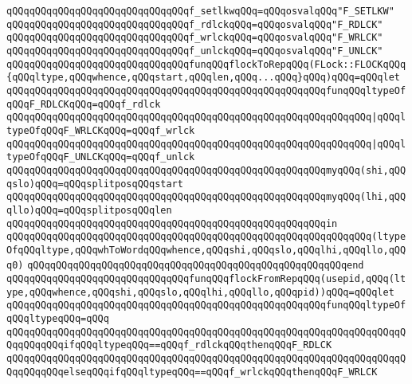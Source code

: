 \verb|qQQqqQQqqQQqqQQqqQQqqQQqqQQqqQQqf_setlkwqQQq=qQQqosvalqQQq"F_SETLKW"|\newline
\verb|qQQqqQQqqQQqqQQqqQQqqQQqqQQqqQQqf_rdlckqQQq=qQQqosvalqQQq"F_RDLCK"|\newline
\verb|qQQqqQQqqQQqqQQqqQQqqQQqqQQqqQQqf_wrlckqQQq=qQQqosvalqQQq"F_WRLCK"|\newline
\verb|qQQqqQQqqQQqqQQqqQQqqQQqqQQqqQQqf_unlckqQQq=qQQqosvalqQQq"F_UNLCK"|\newline
\newline
\verb|qQQqqQQqqQQqqQQqqQQqqQQqqQQqqQQqfunqQQqflockToRepqQQq(FLock::FLOCKqQQq{qQQqltype,qQQqwhence,qQQqstart,qQQqlen,qQQq...qQQq}qQQq)qQQq=qQQqlet|\newline
\verb|qQQqqQQqqQQqqQQqqQQqqQQqqQQqqQQqqQQqqQQqqQQqqQQqqQQqqQQqfunqQQqltypeOfqQQqF_RDLCKqQQq=qQQqf_rdlck|\newline
\verb|qQQqqQQqqQQqqQQqqQQqqQQqqQQqqQQqqQQqqQQqqQQqqQQqqQQqqQQqqQQqqQQq|\verb#|qQQqltypeOfqQQqF_WRLCKqQQq=qQQqf_wrlck#\newline
\verb|qQQqqQQqqQQqqQQqqQQqqQQqqQQqqQQqqQQqqQQqqQQqqQQqqQQqqQQqqQQqqQQq|\verb#|qQQqltypeOfqQQqF_UNLCKqQQq=qQQqf_unlck#\newline
\verb|qQQqqQQqqQQqqQQqqQQqqQQqqQQqqQQqqQQqqQQqqQQqqQQqqQQqqQQqmyqQQq(shi,qQQqslo)qQQq=qQQqsplitposqQQqstart|\newline
\verb|qQQqqQQqqQQqqQQqqQQqqQQqqQQqqQQqqQQqqQQqqQQqqQQqqQQqqQQqmyqQQq(lhi,qQQqllo)qQQq=qQQqsplitposqQQqlen|\newline
\verb|qQQqqQQqqQQqqQQqqQQqqQQqqQQqqQQqqQQqqQQqqQQqqQQqqQQqqQQqin|\newline
\verb|qQQqqQQqqQQqqQQqqQQqqQQqqQQqqQQqqQQqqQQqqQQqqQQqqQQqqQQqqQQqqQQq(ltypeOfqQQqltype,qQQqwhToWordqQQqwhence,qQQqshi,qQQqslo,qQQqlhi,qQQqllo,qQQq0)|\newline
\verb|qQQqqQQqqQQqqQQqqQQqqQQqqQQqqQQqqQQqqQQqqQQqqQQqqQQqqQQqend|\newline
\verb|qQQqqQQqqQQqqQQqqQQqqQQqqQQqqQQqfunqQQqflockFromRepqQQq(usepid,qQQq(ltype,qQQqwhence,qQQqshi,qQQqslo,qQQqlhi,qQQqllo,qQQqpid))qQQq=qQQqlet|\newline
\verb|qQQqqQQqqQQqqQQqqQQqqQQqqQQqqQQqqQQqqQQqqQQqqQQqqQQqqQQqfunqQQqltypeOfqQQqltypeqQQq=qQQq|\newline
\verb|qQQqqQQqqQQqqQQqqQQqqQQqqQQqqQQqqQQqqQQqqQQqqQQqqQQqqQQqqQQqqQQqqQQqqQQqqQQqqQQqifqQQqltypeqQQq==qQQqf_rdlckqQQqthenqQQqF_RDLCK|\newline
\verb|qQQqqQQqqQQqqQQqqQQqqQQqqQQqqQQqqQQqqQQqqQQqqQQqqQQqqQQqqQQqqQQqqQQqqQQqqQQqqQQqelseqQQqifqQQqltypeqQQq==qQQqf_wrlckqQQqthenqQQqF_WRLCK|\newline
